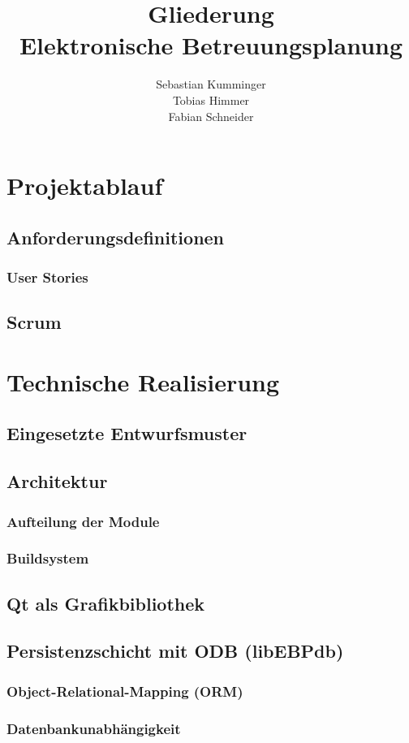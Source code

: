 \documentclass[a4paper,10pt]{article}
\title{Gliederung \\ Elektronische Betreuungsplanung}
\author{Sebastian Kumminger \\
	Tobias Himmer \\
	Fabian Schneider}
\begin{document}
\maketitle

\section{Projektablauf}
\subsection{Anforderungsdefinitionen}
\subsubsection{User Stories}
\subsection{Scrum}

\section{Technische Realisierung}
\subsection{Eingesetzte Entwurfsmuster}
\subsection{Architektur}
\subsubsection{Aufteilung der Module}
\subsubsection{Buildsystem}
\subsection{Qt als Grafikbibliothek}
\subsection{Persistenzschicht mit ODB (libEBPdb)}
\subsubsection{Object-Relational-Mapping (ORM)}
\subsubsection{Datenbankunabhängigkeit}
\end{document}
